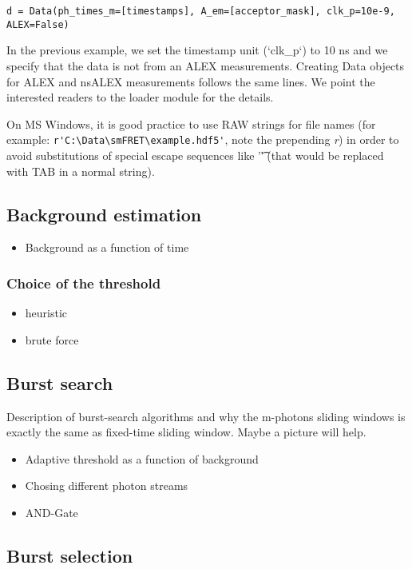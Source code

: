\verb|d = Data(ph_times_m=[timestamps], A_em=[acceptor_mask], clk_p=10e-9, ALEX=False)|

In the previous example, we set the timestamp unit (`clk_p`) to 10 ns and we specify that the data is not from an ALEX measurements. Creating Data objects for ALEX and nsALEX measurements follows the same lines. We point the interested readers to the loader module for the details.

On MS Windows, it is good practice to use RAW strings for file names (for example: \verb|r'C:\Data\smFRET\example.hdf5'|, note the prepending \textit{r}) in order to avoid substitutions of special escape sequences like '\t' (that would be replaced with TAB in a normal string).

\subsection{Background estimation}
\begin{itemize}
\item Background as a function of time
\end{itemize}

\subsubsection{Choice of the threshold}
\begin{itemize}
\item heuristic
\item brute force
\end{itemize}

\subsection{Burst search}

Description of burst-search algorithms and why the m-photons sliding windows is exactly the same as fixed-time sliding window. Maybe a picture will help.

\begin{itemize}
\item Adaptive threshold as a function of background
\item Chosing different photon streams
\item AND-Gate
\end{itemize}

\subsection{Burst selection}

